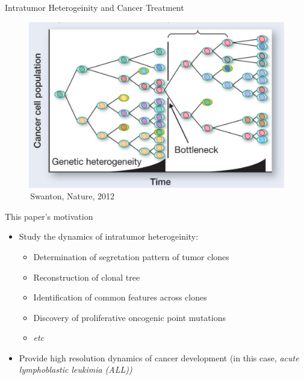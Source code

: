 \documentclass[pdf, aspectratio=169]{beamer}
\begin{document}
\begin{frame}{Intratumor Heterogeinity and Cancer Treatment}

	\begin{figure}
		\center
		\includegraphics[scale=.3]{01.png}
		{\tiny \,Swanton, Nature, 2012}
	\end{figure}
\end{frame}

\begin{frame}{This paper's motivation}
	\begin{itemize}
		\item Study the dynamics of intratumor heterogeinity:
		\begin{itemize}
			\item Determination of segretation pattern of tumor clones
			\item Reconstruction of clonal tree
			\item Identification of common features across clones
			\item Discovery of proliferative oncogenic point mutations
			\item \textit{etc}
		\end{itemize}
		\item Provide high resolution dynamics of cancer development (in this case, \textit{acute lymphoblastic leukimia (ALL))}
	\end{itemize}
\end{frame}
\end{document}
